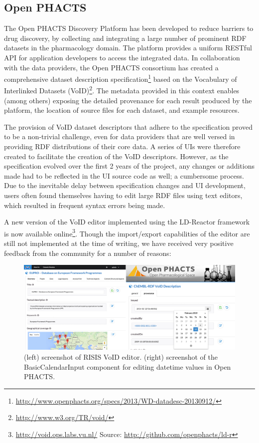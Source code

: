 \documentclass{llncs}
\begin{document}
\subsection{Open PHACTS}

The Open PHACTS Discovery Platform has been developed to reduce barriers to drug discovery, by collecting and integrating a large number of prominent RDF datasets in the pharmacology domain. The platform provides a uniform RESTful API for application developers to access the integrated data.
In collaboration with the data providers, the Open PHACTS consortium has created a comprehensive dataset description specification\footnote{\url{http://www.openphacts.org/specs/2013/WD-datadesc-20130912/}} based on the Vocabulary of Interlinked Datasets (VoID)\footnote{\url{http://www.w3.org/TR/void/}}. The metadata provided in this context enables (among others) exposing the detailed provenance for each result produced by the platform, the location of source files for each dataset, and example resources.

The provision of VoID dataset descriptors that adhere to the specification proved to be a non-trivial challenge, even for data providers that are well versed in providing RDF distributions of their core data. A series of UIs were therefore created to facilitate the creation of the VoID descriptors. However, as the specification evolved over the first 2 years of the project, any changes or additions made had to be reflected in the UI source code as well; a cumbersome process. Due to the inevitable delay between specification changes and UI development, users often found themselves having to edit large RDF files using text editors, which resulted in frequent syntax errors being made.

A new version of the VoID editor implemented using the LD-Reactor framework is now available online\footnote{\url{http://void.ops.labs.vu.nl/} Source: \url{http://github.com/openphacts/ld-r}}. Though the  import/export capabilities of the editor are still not implemented at the time of writing, we have received very positive feedback from the community for a number of reasons:

\begin{figure}[tb]
\center
  \includegraphics[width=1\linewidth]{images/opsRISIS.jpg}
  \caption{(left) screenshot of RISIS VoID editor. (right) screenshot of the BasicCalendarInput component for editing datetime values in Open PHACTS.}
  \label{fig:opsLdr}
\end{figure}
\end{document}
